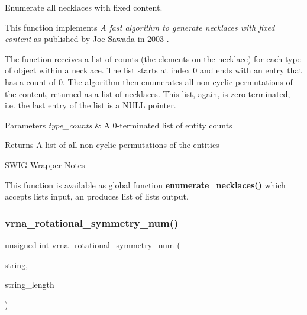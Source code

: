 Enumerate all necklaces with fixed content. 

This function implements {\itshape A fast algorithm to generate necklaces with fixed content} as published by Joe Sawada in 2003 \cite{sawada:2003}.

The function receives a list of counts (the elements on the necklace) for each type of object within a necklace. The list starts at index 0 and ends with an entry that has a count of 0. The algorithm then enumerates all non-\/cyclic permutations of the content, returned as a list of necklaces. This list, again, is zero-\/terminated, i.\+e. the last entry of the list is a {\ttfamily N\+U\+LL} pointer.


\begin{DoxyParams}{Parameters}
{\em type\+\_\+counts} & A 0-\/terminated list of entity counts \\
\hline
\end{DoxyParams}
\begin{DoxyReturn}{Returns}
A list of all non-\/cyclic permutations of the entities
\end{DoxyReturn}
\begin{DoxyRefDesc}{S\+W\+I\+G Wrapper Notes}
\item[\mbox{\hyperlink{wrappers__wrappers000015}{S\+W\+I\+G Wrapper Notes}}]This function is available as global function {\bfseries{enumerate\+\_\+necklaces()}} which accepts lists input, an produces list of lists output. \end{DoxyRefDesc}
\mbox{\label{group__combinatorics__utils_gac51464b5281833a58c25f9447252c495}} 
\subsubsection{\texorpdfstring{vrna\_rotational\_symmetry\_num()}{vrna\_rotational\_symmetry\_num()}}
{\footnotesize\ttfamily unsigned int vrna\+\_\+rotational\+\_\+symmetry\+\_\+num (\begin{DoxyParamCaption}\item[{const unsigned int $\ast$}]{string,  }\item[{size\+\_\+t}]{string\+\_\+length }\end{DoxyParamCaption})}



